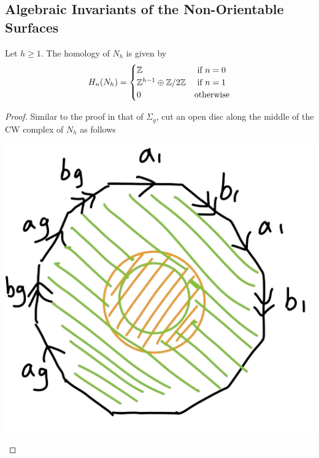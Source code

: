 \documentclass[a4paper]{article}
\begin{document}
\subsection{Algebraic Invariants of the Non-Orientable Surfaces}
\begin{prp}{}{} Let $h\geq 1$. The homology of $N_h$ is given by $$H_n(N_h)=\begin{cases}
\mathbb{Z} & \text{ if } n=0\\
\mathbb{Z}^{h-1}\oplus\mathbb{Z}/2\mathbb{Z} & \text{ if } n=1\\
0 & \text{otherwise}
\end{cases}$$ \tcbline
\begin{proof}
Similar to the proof in that of $\Sigma_g$, cut an open disc along the middle of the CW complex of $N_h$ as follows 

\begin{center}
\includegraphics[scale = 0.3]{Image 5}
\end{center}


\end{proof}
\end{prp}
\end{document}
